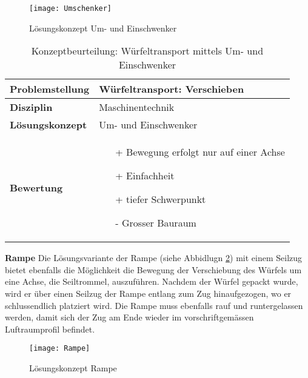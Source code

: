 \documentclass[../../main.tex]{subfiles}
\begin{document}
\begin{figure}[H] %
    \centering
    \texttt{[image: Umschenker]}
    \caption{Lösungskonzept Um- und Einschwenker}
    \label{fig:umschenker}
\end{figure}

\begin{flushleft}
    \begin{table}[h]
    \begin{tabular}{ | l | p{11cm} |}
    \hline
    \textbf{Problemstellung} & Würfeltransport: Verschieben \\ \hline
    \textbf{Disziplin} & Maschinentechnik \\ \hline
    \textbf{Lösungskonzept} &  Um- und Einschwenker \\ \hline
    \textbf{Bewertung} &  \begin{itemize}
                            \item[+] Bewegung erfolgt nur auf einer Achse
                            \item[+] Einfachheit
                            \item[+] tiefer Schwerpunkt
                            \item[-] Grosser Bauraum
                          \end{itemize} \\ \hline
    \end{tabular}
    \caption{Konzeptbeurteilung: Würfeltransport mittels Um- und Einschwenker}
    \label{tab:konzept_wurfeltrransport_umschwenker}
\end{table}
\end{flushleft}

\textbf{Rampe}
Die Lösungsvariante der Rampe (siehe Abbidlugn \ref{fig:rampe}) mit einem Seilzug bietet ebenfalls die Möglichkeit die Bewegung der Verschiebung des Würfels um eine Achse, die Seiltrommel, auszuführen. Nachdem der Würfel gepackt wurde, wird er über einen Seilzug der Rampe entlang zum Zug hinaufgezogen, wo er schlussendlich platziert wird. Die Rampe muss ebenfalls rauf und runtergelassen werden, damit sich der Zug am Ende wieder im vorschriftgemässen Luftraumprofil befindet.

\begin{figure}[H] %
    \centering
    \texttt{[image: Rampe]}
    \caption{Lösungskonzept Rampe}
    \label{fig:rampe}
\end{figure}
\end{document}
